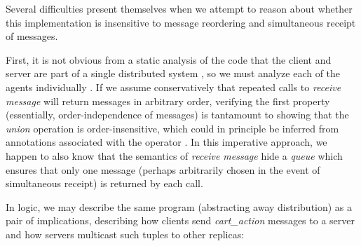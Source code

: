 Several difficulties present themselves when we attempt to reason about whether
this implementation is insensitive to message reordering and simultaneous receipt of messages.  

First, it is not obvious from a static analysis of the code that the client and server are
part of a single distributed system , so we must analyze each of the agents individually . 
If we assume conservatively that repeated calls to {\em receive message} will return messages in
arbitrary order, verifying the first property (essentially, order-independence of messages)
is tantamount to showing that the {\em union} operation is
order-insensitive, which could in principle be inferred from annotations associated
with the operator .
In this imperative approach, we happen to also know that the semantics of {\em receive message}
hide a {\em queue} which ensures that only one message (perhaps arbitrarily chosen in the
event of simultaneous receipt) is returned by each call.


In logic, we may describe the same program (abstracting away distribution)
as a pair of implications, describing how clients send {\em cart\_action}
messages to a server and how servers multicast such tuples to other replicas:



